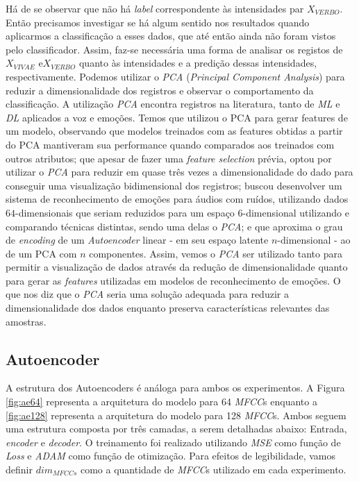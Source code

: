 Há de se observar que não há \textit{label} correspondente às intensidades par $X_{VERBO}$. Então precisamos investigar se há algum sentido nos resultados quando aplicarmos a classificação a esses dados, que até então ainda não foram vistos pelo classificador. Assim, faz-se necessária uma forma de analisar os registos de $X_{VIVAE}$ e$X_{VERBO}$ quanto às intensidades e a predição dessas intensidades, respectivamente. Podemos utilizar o \textit{PCA} (\textit{Principal Component Analysis}) para reduzir a dimensionalidade dos registros e observar o comportamento da classificação. A utilização \textit{PCA} encontra registros na literatura, tanto de \textit{ML} e \textit{DL} aplicados a voz e emoções. Temos \cite{pca1} que utilizou o PCA para gerar features de um modelo, observando que modelos treinados com as features obtidas a partir do PCA mantiveram sua performance quando comparados aos treinados com outros atributos; \cite{pca2} que apesar de fazer uma \textit{feature selection} prévia, optou por utilizar o \textit{PCA} para reduzir em quase três vezes a dimensionalidade do dado para conseguir uma visualização bidimensional dos registros; \cite{pca3} buscou desenvolver um sistema de reconhecimento de emoções para áudios com ruídos, utilizando dados $64$-dimensionais que seriam reduzidos para um espaço $6$-dimensional utilizando e comparando técnicas distintas, sendo uma delas o \textit{PCA}; e \cite{pca5} que aproxima o grau de \textit{encoding} de um \textit{Autoencoder} linear - em seu espaço latente $n$-dimensional - ao de um PCA com $n$ componentes. Assim, vemos o \textit{PCA} ser utilizado tanto para permitir a visualização de dados através da redução de dimensionalidade quanto para gerar as \textit{features} utilizadas em modelos de reconhecimento de emoções. O que nos diz que o \textit{PCA} seria uma solução adequada para reduzir a dimensionalidade dos dados enquanto preserva características relevantes das amostras.

\subsection{Autoencoder}

A estrutura dos Autoencoders é análoga para ambos os experimentos. A Figura \ref{fig:ae64} representa a arquitetura do modelo para 64 \textit{MFCC}s enquanto a \ref{fig:ae128} representa a arquitetura do modelo para 128 \textit{MFCC}s. Ambos seguem uma estrutura composta por três camadas, a serem detalhadas abaixo: Entrada, \textit{encoder} e \textit{decoder}. O treinamento foi realizado utilizando \textit{MSE} como função de \textit{Loss} e \textit{ADAM} como função de otimização. Para efeitos de legibilidade, vamos definir $dim_{MFCCs}$ como a quantidade de \textit{MFCC}s utilizado em cada experimento.

